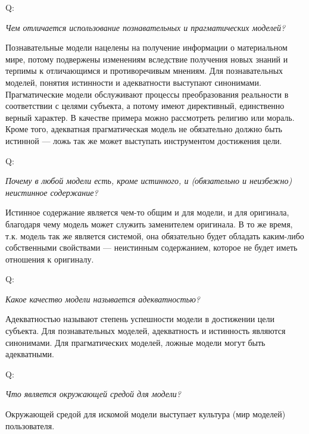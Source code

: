 \documentclass{article}
\newcommand{\question}[2]{
	\begin{flushright}
		Q:\hspace{2ex}\vline\hspace{2ex}
		\begin{minipage}{0.9\textwidth}
			\large
			\textit{#1}
		\end{minipage}
	\end{flushright}
	\begin{center}
		\begin{minipage}{0.95\textwidth}
			#2
		\end{minipage}
	\end{center}
	}
\begin{document}
\question{Чем отличается использование познавательных и прагматических моделей?}{Познавательные модели нацелены на получение информации о материальном мире, потому подвержены изменениям вследствие получения новых знаний и терпимы к отличающимся и противоречивым мнениям. Для познавательных моделей, понятия истинности и адекватности выступают синонимами.\\Прагматические модели обслуживают процессы преобразования реальности в соответствии с целями субъекта, а потому имеют директивный, единственно верный характер. В качестве примера можно рассмотреть религию или мораль. Кроме того, адекватная прагматическая модель не обязательно должно быть истинной --- ложь так же может выступать инструментом достижения цели.}
\question{Почему в любой модели есть, кроме истинного, и (обязательно и неизбежно) неистинное содержание?}{Истинное содержание является чем-то общим и для модели, и для оригинала, благодаря чему модель может служить заменителем оригинала. В то же время, т.к. модель так же является системой, она обязательно будет обладать каким-либо собственными свойствами --- неистинным содержанием, которое не будет иметь отношения к оригиналу.}
\question{Какое качество модели называется адекватностью?}{Адекватностью называют степень успешности модели в достижении цели субъекта. Для познавательных моделей, адекватность и истинность являются синонимами. Для прагматических моделей, ложные модели могут быть адекватными.}
\question{Что является окружающей средой для модели?}{Окружающей средой для искомой модели выступает культура (мир моделей) пользователя.}
\end{document}
